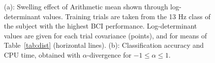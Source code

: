 \begin{figure}[h!]
\centering
{}
\caption{(a): Swelling effect of Arithmetic mean shown through log-determinant values. Training trials are taken from the 13 Hz class of the subject with the highest BCI performance. Log-determinant values are given for each trial covariance (points), and for means of Table~\ref{tab:dist} (horizontal lines). (b): Classification accuracy and CPU time, obtained with $\alpha$-divergence for $-1\leqslant \alpha  \leqslant 1$.} 
\label{fig:swel_alpha}
\end{figure} 


